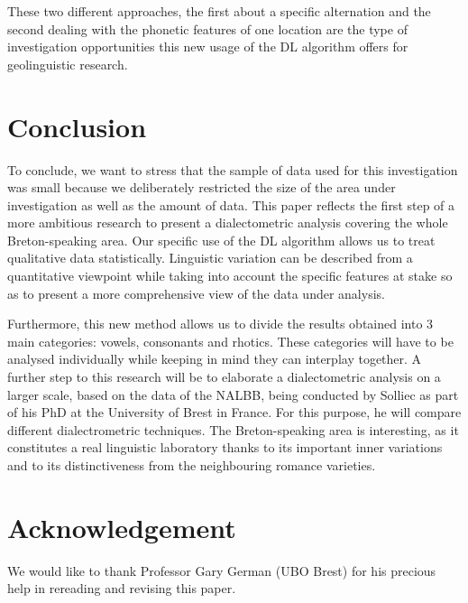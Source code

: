 \documentclass[output=paper]{LSP/langsci}
\begin{document}
These two different approaches, the first about a specific alternation and the second dealing with the phonetic features of one location are the type of investigation opportunities this new usage of the DL algorithm offers for geolinguistic research. 

\section{Conclusion}

To conclude, we want to stress that the sample of data used for this investigation was small because we deliberately restricted the size of the area under investigation as well as the amount of data. This paper reflects the first step of a more ambitious research to present a dialectometric analysis covering the whole Breton-speaking area. Our specific use of the DL algorithm allows us to treat qualitative data statistically. Linguistic variation can be described from a quantitative viewpoint while taking into account the specific features at stake so as to present a more comprehensive view of the data under analysis.

Furthermore, this new method allows us to divide the results obtained into 3 main categories: vowels, consonants and rhotics. These categories will have to be analysed individually while keeping in mind they can interplay together. A further step to this research will be to elaborate a dialectometric analysis on a larger scale, based on the data of the NALBB, being conducted by Solliec as part of his PhD at the University of Brest in France. For this purpose, he will compare different dialectrometric techniques. The Breton-speaking area is interesting, as it constitutes a real linguistic laboratory thanks to its important inner variations and to its distinctiveness from the neighbouring romance varieties.

\section*{Acknowledgement}
We would like to thank Professor Gary German (UBO Brest) for his precious help in rereading and revising this paper.

\printbibliography[heading=subbibliography,notkeyword=this]
\end{document}
